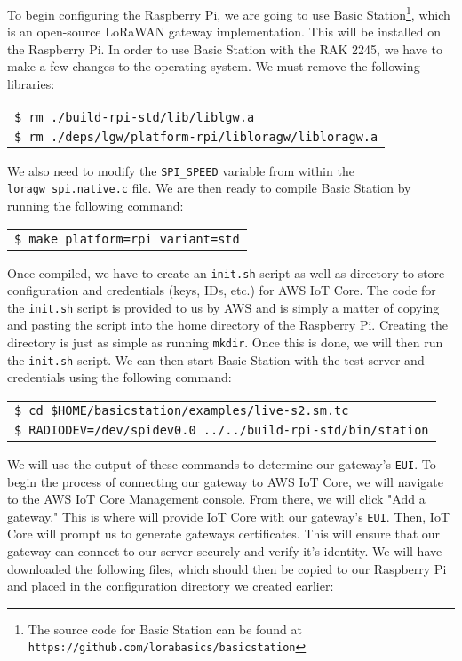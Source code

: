 To begin configuring the Raspberry Pi, we are going to use Basic Station\footnote{The source code for Basic Station can be found at \texttt{https://github.com/lorabasics/basicstation}}, which is an open-source LoRaWAN gateway implementation. This will be installed on the Raspberry Pi. In order to use Basic Station with the RAK 2245, we have to make a few changes to the operating system. We must remove the following libraries:

\begin{tabular}{l}
     \texttt{\$ rm ./build-rpi-std/lib/liblgw.a} \\
     \texttt{\$ rm ./deps/lgw/platform-rpi/libloragw/libloragw.a} \\
\end{tabular}

We also need to modify the \texttt{SPI\_SPEED} variable from within the \\ \texttt{loragw\_spi.native.c} file. We are then ready to compile Basic Station by running the following command:

\begin{tabular}{l}
     \texttt{\$ make platform=rpi variant=std} \\
\end{tabular}

Once compiled, we have to create an \texttt{init.sh} script as well as directory to store configuration and credentials (keys, IDs, etc.) for AWS IoT Core. The code for the \texttt{init.sh} script is provided to us by AWS and is simply a matter of copying and pasting the script into the home directory of the Raspberry Pi. Creating the directory is just as simple as running \texttt{mkdir}. Once this is done, we will then run the \texttt{init.sh} script. We can then start Basic Station with the test server and credentials using the following command:

\begin{tabular}{l}
     \texttt{\$ cd \$HOME/basicstation/examples/live-s2.sm.tc} \\
     \texttt{\$ RADIODEV=/dev/spidev0.0 ../../build-rpi-std/bin/station} \\
\end{tabular}

We will use the output of these commands to determine our gateway's \texttt{EUI}. To begin the process of connecting our gateway to AWS IoT Core, we will navigate to the AWS IoT Core Management console. From there, we will click "Add a gateway." This is where will provide IoT Core with our gateway's \texttt{EUI}. Then, IoT Core will prompt us to generate gateways certificates. This will ensure that our gateway can connect to our server securely and verify it's identity. We will have downloaded the following files, which should then be copied to our Raspberry Pi and placed in the configuration directory we created earlier:

